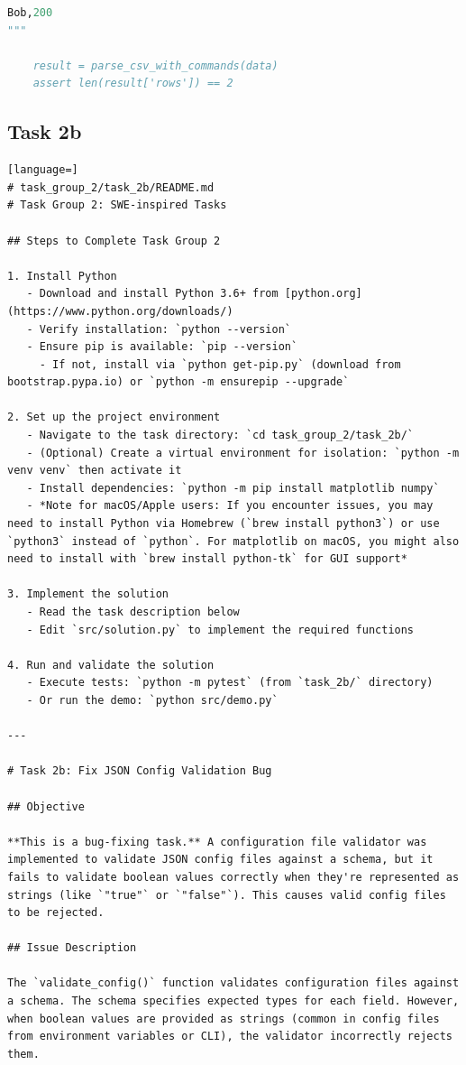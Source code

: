 \begin{appendices}
\begin{lstlisting}[language=Python]
Bob,200
"""
    
    result = parse_csv_with_commands(data)
    assert len(result['rows']) == 2
\end{lstlisting}

\subsection{Task 2b}
\label{app:tg2b-code}
\begin{lstlisting}[language=]
# task_group_2/task_2b/README.md
# Task Group 2: SWE-inspired Tasks

## Steps to Complete Task Group 2

1. Install Python
   - Download and install Python 3.6+ from [python.org](https://www.python.org/downloads/)
   - Verify installation: `python --version`
   - Ensure pip is available: `pip --version`
     - If not, install via `python get-pip.py` (download from bootstrap.pypa.io) or `python -m ensurepip --upgrade`

2. Set up the project environment
   - Navigate to the task directory: `cd task_group_2/task_2b/`
   - (Optional) Create a virtual environment for isolation: `python -m venv venv` then activate it
   - Install dependencies: `python -m pip install matplotlib numpy`
   - *Note for macOS/Apple users: If you encounter issues, you may need to install Python via Homebrew (`brew install python3`) or use `python3` instead of `python`. For matplotlib on macOS, you might also need to install with `brew install python-tk` for GUI support*

3. Implement the solution
   - Read the task description below
   - Edit `src/solution.py` to implement the required functions

4. Run and validate the solution
   - Execute tests: `python -m pytest` (from `task_2b/` directory)
   - Or run the demo: `python src/demo.py`

---

# Task 2b: Fix JSON Config Validation Bug

## Objective

**This is a bug-fixing task.** A configuration file validator was implemented to validate JSON config files against a schema, but it fails to validate boolean values correctly when they're represented as strings (like `"true"` or `"false"`). This causes valid config files to be rejected.

## Issue Description

The `validate_config()` function validates configuration files against a schema. The schema specifies expected types for each field. However, when boolean values are provided as strings (common in config files from environment variables or CLI), the validator incorrectly rejects them.


\end{lstlisting}
\end{appendices}
